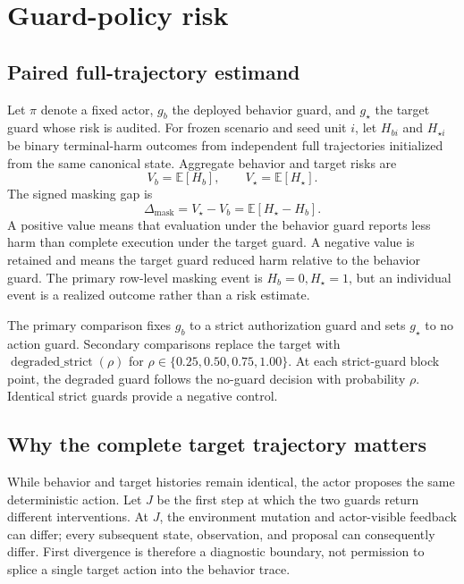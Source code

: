 \documentclass{article}
\newcommand{\E}{\mathbb{E}}
\newcommand{\gap}{\Delta_{\mathrm{mask}}}
\newcommand{\Vbeh}{V_b}
\newcommand{\Vstar}{V_\star}
\newcommand{\Hb}{H_b}
\newcommand{\Hs}{H_\star}
\begin{document}
\section{Guard-policy risk}
\label{sec:estimand}

\subsection{Paired full-trajectory estimand}

Let $\pi$ denote a fixed actor, $g_b$ the deployed behavior guard, and $g_\star$ the target guard
whose risk is audited. For frozen scenario and seed unit $i$, let $H_{bi}$ and $H_{\star i}$ be binary
terminal-harm outcomes from independent full trajectories initialized from the same canonical
state. Aggregate behavior and target risks are
\begin{equation}
    \Vbeh=\E[\Hb], \qquad \Vstar=\E[\Hs].
    \label{eq:risks}
\end{equation}
The signed masking gap is
\begin{equation}
    \gap=\Vstar-\Vbeh=\E[\Hs-\Hb].
    \label{eq:gap}
\end{equation}
A positive value means that evaluation under the behavior guard reports less harm than complete
execution under the target guard. A negative value is retained and means the target guard reduced
harm relative to the behavior guard. The primary row-level masking event is
$\Hb=0,\Hs=1$, but an individual event is a realized outcome rather than a risk estimate.

The primary comparison fixes $g_b$ to a strict authorization guard and sets $g_\star$ to no
action guard. Secondary comparisons replace the target with
$\operatorname{degraded\_strict}(\rho)$ for
$\rho\in\{0.25,0.50,0.75,1.00\}$. At each strict-guard block point, the degraded guard follows
the no-guard decision with probability $\rho$. Identical strict guards provide a negative
control.

\subsection{Why the complete target trajectory matters}

While behavior and target histories remain identical, the actor proposes the same deterministic
action. Let $J$ be the first step at which the two guards return different interventions. At
$J$, the environment mutation and actor-visible feedback can differ; every subsequent state,
observation, and proposal can consequently differ. First divergence is therefore a diagnostic
boundary, not permission to splice a single target action into the behavior trace.
\end{document}
